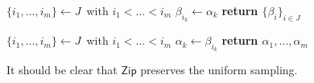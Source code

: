\documentclass{iacrtrans}
\begin{document}
\begin{minipage}[t]{0.46\textwidth}
\vspace{0pt}
\begin{algorithm}[H]
    \centering
    \caption{$\mathsf{Zip}\hspace{1pt}
    (\alpha_1, \dots, \alpha_m;
    \hspace{2pt} J\hspace{1pt})$}\label{alg_zip}
    \begin{algorithmic}
    	\vspace{2pt}
    	\State
			$\{i_1, \dots, i_m\} \leftarrow J$\ with
			$i_1 < \dots < i_m$\vspace{3pt}
    	\vspace{2pt}
			\State
    			$\beta_{i_k} \leftarrow \alpha_k$\vspace{2pt}
		\EndFor
        \State \textbf{return $\{\beta_i\}_{i \in J}$}
    \end{algorithmic}
\end{algorithm}
\vspace{0pt}
\end{minipage}
\hfill
\begin{minipage}[t]{0.46\textwidth}
\vspace{0pt}
\begin{algorithm}[H]
    \centering
    \caption{$\mathsf{Zip}^{-1}\hspace{1pt}
    (\hspace{1pt}\{\beta_i\}_{i \in J})$}\label{alg_zip_inv}
    \begin{algorithmic}
    	\vspace{2pt}
    	\State
			$\{i_1, \dots, i_m\} \leftarrow J$\ with
			$i_1 < \dots < i_m$\vspace{3pt}
    	\vspace{2pt}
			\State
    			$\alpha_k \leftarrow \beta_{i_k}$\vspace{2pt}
		\EndFor
        \State \textbf{return $\alpha_1, \dots, \alpha_m$}
    \end{algorithmic}
\end{algorithm}\vspace{0pt}
\vspace{0pt}
\end{minipage}

\noindent
It should be clear that $\mathsf{Zip}$
preserves the uniform sampling.
\end{document}
